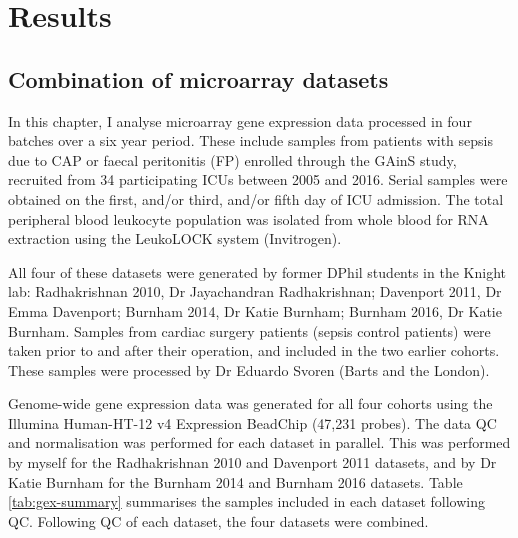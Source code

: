 \section{Results}
\subsection{Combination of microarray datasets}
In this chapter, I analyse microarray gene expression data processed in four batches over a six year period. These include samples from patients with sepsis due to CAP or faecal peritonitis (FP) enrolled through the GAinS study, recruited from 34 participating ICUs between 2005 and 2016. Serial samples were obtained on the first, and/or third, and/or fifth day of ICU admission. The total peripheral blood leukocyte population was isolated from whole blood for RNA extraction using the LeukoLOCK system (Invitrogen).

All four of these datasets were generated by former DPhil students in the Knight lab: Radhakrishnan 2010, Dr Jayachandran Radhakrishnan; Davenport 2011, Dr Emma Davenport; Burnham 2014, Dr Katie Burnham; Burnham 2016, Dr Katie Burnham. Samples from cardiac surgery patients (sepsis control patients) were taken prior to and after their operation, and included in the two earlier cohorts. These samples were processed by Dr Eduardo Svoren (Barts and the London).

Genome-wide gene expression data was generated for all four cohorts using the Illumina Human-HT-12 v4 Expression BeadChip (47,231 probes). The data QC and normalisation was performed for each dataset in parallel. This was performed by myself for the Radhakrishnan 2010 and Davenport 2011 datasets, and by Dr Katie Burnham for the Burnham 2014 and Burnham 2016 datasets. Table \ref{tab:gex-summary} summarises the samples included in each dataset following QC. Following QC of each dataset, the four datasets were combined.

